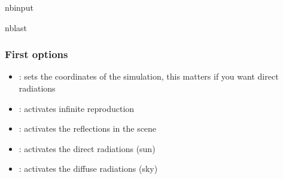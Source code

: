 \documentclass[letterpaper,10pt,english]{sphinxmanual}
\begin{document}
\begin{sphinxuseclass}{nbinput}
\begin{sphinxuseclass}{nblast}
{
\begin{sphinxVerbatim}[commandchars=\\\{\}]
\llap{\color{nbsphinxin}[2]:\,\hspace{\fboxrule}\hspace{\fboxsep}}   

  
    
  \PYG{p}{[}\PYG{p}{]}
   
\end{sphinxVerbatim}
}

\end{sphinxuseclass}
\end{sphinxuseclass}

\subsubsection{First options}
\label{\detokenize{environment_parameters:First-options}}\begin{itemize}
\item {} 
\sphinxAtStartPar
{}: sets the coordinates of the simulation, this matters if you want direct radiations

\item {} 
\sphinxAtStartPar
{}: activates infinite reproduction

\item {} 
\sphinxAtStartPar
{}: activates the reflections in the scene

\item {} 
\sphinxAtStartPar
{}: activates the direct radiations (sun)

\item {} 
\sphinxAtStartPar
{}: activates the diffuse radiations (sky)

\end{itemize}
\end{document}
